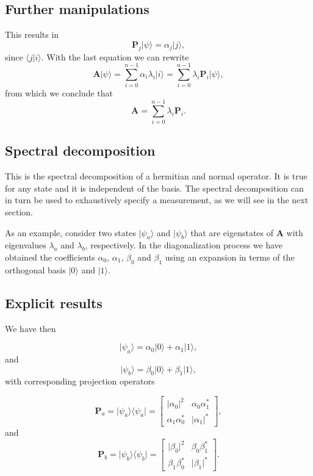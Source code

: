 \subsection{Further manipulations}

This results in
\[
\bm{P}_{j}\vert \psi\rangle=\alpha_j\vert j\rangle,
\]
since $\langle j\vert i\rangle$.
With the last equation we can rewrite
\[
\bm{A}\vert \psi \rangle = \sum_{i=0}^{n-1}\alpha_i\lambda_i\vert i\rangle=\sum_{i=0}^{n-1}\lambda_i\bm{P}_i\vert \psi\rangle,
\]
from which we conclude that
\[
\bm{A}=\sum_{i=0}^{n-1}\lambda_i\bm{P}_i.
\]

\subsection{Spectral decomposition}

This is the spectral decomposition of a hermitian and normal
operator. It is true for any state and it is independent of the
basis. The spectral decomposition can in turn be used to exhaustively
specify a measurement, as we will see in the next section.

As an example, consider two states $\vert \psi_a\rangle$ and $\vert
\psi_b\rangle$ that are eigenstates of $\bm{A}$ with eigenvalues
$\lambda_a$ and $\lambda_b$, respectively. In the diagonalization
process we have obtained the coefficients $\alpha_0$, $\alpha_1$,
$\beta_0$ and $\beta_1$ using an expansion in terms of the orthogonal
basis $\vert 0\rangle$ and $\vert 1\rangle$.

\subsection{Explicit results}

We have then

\[
\vert \psi_a\rangle = \alpha_0\vert 0\rangle+\alpha_1\vert 1\rangle,
\]
and
\[
\vert \psi_b\rangle = \beta_0\vert 0\rangle+\beta_1\vert 1\rangle,
\]
with corresponding projection operators

\[
\bm{P}_a=\vert \psi_a\rangle \langle \psi_a\vert = \begin{bmatrix} \vert \alpha_0\vert^2 &\alpha_0\alpha_1^* \\
                                                                   \alpha_1\alpha_0^* & \vert \alpha_1\vert^* \end{bmatrix},
\]    
and
\[
\bm{P}_b=\vert \psi_b\rangle \langle \psi_b\vert = \begin{bmatrix} \vert \beta_0\vert^2 &\beta_0\beta_1^* \\
                                                                   \beta_1\beta_0^* & \vert \beta_1\vert^* \end{bmatrix}.
\]

